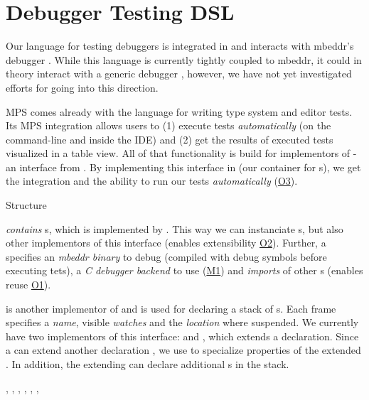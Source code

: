 \section{Debugger Testing DSL}

Our language for testing debuggers is integrated in  and interacts
with mbeddr's debugger . While this language is currently tightly
coupled to mbeddr, it could in theory interact with a generic debugger ,
however, we have not yet investigated efforts for going into this direction.


\ac{MPS} comes already with the language  for writing type
system and editor tests.
Its \ac{MPS} integration allows users to (1) execute tests \emph{automatically}
(on the command-line and inside the \ac{IDE}) and (2) get the results of
executed tests visualized in a table view. All of that functionality is build for implementors
of  - an interface from . By implementing this
interface in  (our container for
s), we get the  integration and the ability to
run our tests \emph{automatically} (\hyperref[O3]{O3}).

Structure

 \emph{contains} s, which is
implemented by . This way we can instanciate
s, but also other implementors of this interface
(enables extensibility \hyperref[O2]{O2}). Further, a 
specifies an \emph{mbeddr binary} to debug (compiled with debug symbols before
executing tets), a \emph{C debugger backend} to use (\hyperref[M1]{M1}) and
\emph{imports} of other s (enables reuse \hyperref[O1]{O1}).

 is another implementor of 
and is used for declaring a stack of s. Each frame specifies a
\emph{name}, visible \emph{watches} and the \emph{location} where suspended.
We currently have two implementors of this interface: 
and , which extends a declaration. 
Since a  can extend another declaration
, we use  to specialize properties of
the extended . In addition, the extending
 can declare additional s in
the stack. 

, , 
, , 
, , 

